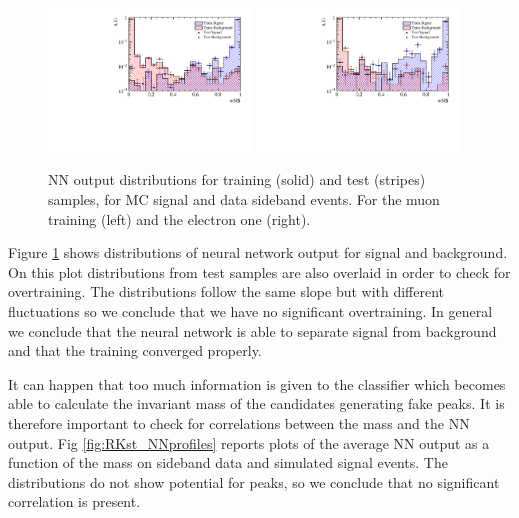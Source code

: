 \begin{figure}
\centering
\includegraphics[width=0.48\textwidth]{RKst/figs/Training/MM_wNB_TrainAndTest.pdf}
\includegraphics[width=0.48\textwidth]{RKst/figs/Training/EE_wNB_TrainAndTest.pdf}

\caption{NN output distributions for training (solid) and test (stripes) samples, for MC signal and data sideband events.
For the muon training (left) and the electron one (right).}
\label{fig:RKst_nnDist}
\end{figure}

Figure \ref{fig:RKst_nnDist} shows distributions of neural network output for signal and background.
On this plot distributions from test samples are also overlaid in order to check for overtraining. 
The distributions follow the same slope but with different fluctuations so we conclude that we have no
significant overtraining. In general we conclude that the neural network is able to separate signal
from background and that the training converged properly.

It can happen that too much information is given to the classifier which becomes able to 
calculate the invariant mass of the candidates generating fake peaks. It is therefore important to check
for correlations between the \Bz mass and the NN output.  Fig \ref{fig:RKst_NNprofiles} reports plots of
the average NN output as a function of the \Bz mass on sideband data and simulated signal events.
The distributions do not show potential for peaks, so we conclude that no significant correlation is present.

